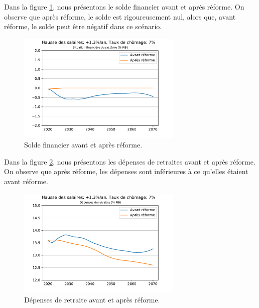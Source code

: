 \documentclass[10pt]{article}
\begin{document}
Dans la figure \ref{fig-solde-avant-apres-reforme}, nous présentons le 
solde financier avant et après réforme. 
On observe que après réforme, le solde est rigoureusement nul, 
alors que, avant réforme, le solde peut être négatif dans ce scénario. 

\begin{figure}
\begin{center}
\includegraphics[width=0.7\textwidth]{Simulation-vs-avant-reforme-Solde.pdf}
\end{center}
\caption{Solde financier avant et après réforme.}
\label{fig-solde-avant-apres-reforme}
\end{figure}

Dans la figure \ref{fig-depenses-avant-apres-reforme}, nous présentons les 
dépenses de retraites avant et après réforme. 
On observe que après réforme, les dépenses sont inférieures à ce qu'elles 
étaient avant réforme. 

\begin{figure}
\begin{center}
\includegraphics[width=0.7\textwidth]{Simulation-vs-avant-reforme-Depenses.pdf}
\end{center}
\caption{Dépenses de retraite avant et après réforme.}
\label{fig-depenses-avant-apres-reforme}
\end{figure}
\end{document}
